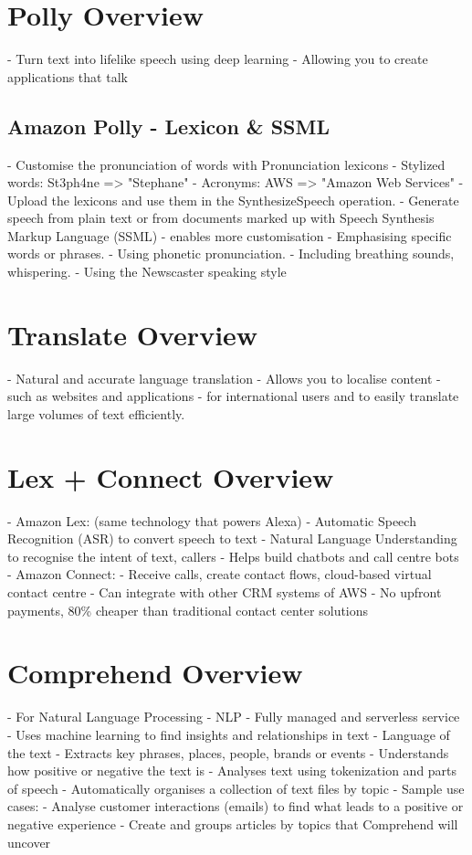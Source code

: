 \documentclass[11pt]{book}
\begin{document}
    \section{Polly Overview}
    - Turn text into lifelike speech using deep learning
    - Allowing you to create applications that talk

    \subsection{Amazon Polly - Lexicon \& SSML}
    - Customise the pronunciation of words with Pronunciation lexicons
        - Stylized words: St3ph4ne => "Stephane"
        - Acronyms: AWS => "Amazon Web Services"
    - Upload the lexicons and use them in the SynthesizeSpeech operation.
    - Generate speech from plain text or from documents marked up with Speech Synthesis Markup Language (SSML) - enables more customisation
        - Emphasising specific words or phrases.
        - Using phonetic pronunciation.
        - Including breathing sounds, whispering.
        - Using the Newscaster speaking style

    \section{Translate Overview}
    - Natural and accurate language translation
    - Allows you to localise content - such as websites and applications - for international users and to easily translate large volumes of text efficiently.

    \section{Lex + Connect Overview}
    - Amazon Lex: (same technology that powers Alexa)
        - Automatic Speech Recognition (ASR) to convert speech to text
        - Natural Language Understanding to recognise the intent of text, callers
        - Helps build chatbots and call centre bots
    - Amazon Connect:
        - Receive calls, create contact flows, cloud-based virtual contact centre
        - Can integrate with other CRM systems of AWS
        - No upfront payments, 80\% cheaper than traditional contact center solutions 🤔
    \section{Comprehend Overview}
    - For Natural Language Processing - NLP
    - Fully managed and serverless service
    - Uses machine learning to find insights and relationships in text
        - Language of the text
        - Extracts key phrases, places, people, brands or events
        - Understands how positive or negative the text is
        - Analyses text using tokenization and parts of speech
        - Automatically organises a collection of text files by topic
    - Sample use cases:
        - Analyse customer interactions (emails) to find what leads to a positive or negative experience
        - Create and groups articles by topics that Comprehend will uncover
\end{document}
